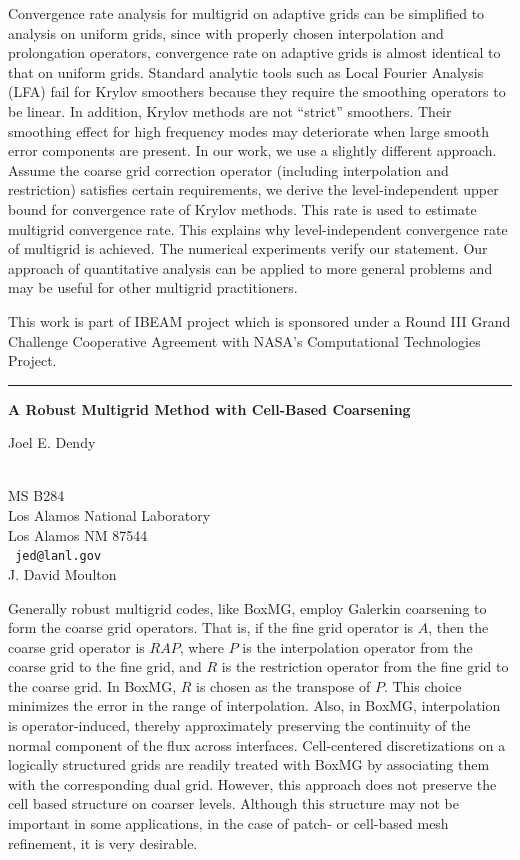 \documentclass[twosided]{report}
\begin{document}
Convergence rate analysis for multigrid on adaptive grids can be
simplified to analysis on uniform grids, since with properly chosen
interpolation and prolongation operators, convergence rate on adaptive
grids is almost identical to that on uniform grids. Standard analytic
tools such as Local Fourier Analysis (LFA) fail for Krylov smoothers
because they require the smoothing operators to be linear. In addition,
Krylov methods are not ``strict'' smoothers. Their smoothing effect for
high frequency modes may deteriorate when large smooth error components
are present. In our work, we use a slightly different approach. Assume
the coarse grid correction operator (including interpolation and
restriction) satisfies certain requirements, we derive the
level-independent upper bound for convergence rate of Krylov methods.
This rate is used to estimate multigrid convergence rate. This explains
why level-independent convergence rate of multigrid is achieved. The
numerical experiments verify our statement. Our approach of
quantitative analysis can be applied to more general problems and may
be useful for other multigrid practitioners.

This work is part of IBEAM project which is sponsored under a Round III
Grand Challenge Cooperative Agreement with NASA's Computational
Technologies Project.


\begin{center} \rule{6in}{1pt} \end{center}
\newpage	%


\begin{center}
{\large			\label{dendy}
{\bf
A Robust Multigrid Method with Cell-Based Coarsening
}

Joel E. Dendy} \\
MS B284
\\
Los Alamos National Laboratory
\\
Los Alamos NM 87544
\\ {\tt
jed@lanl.gov
}
\\
J. David Moulton
\end{center}

Generally robust multigrid codes, like BoxMG, employ Galerkin
coarsening to form the coarse grid operators. That is, if the fine
grid operator is $A$, then the coarse grid operator is $RAP$, where
$P$ is the interpolation operator from the coarse grid to the fine
grid, and $R$ is the restriction operator from the fine grid to the
coarse grid. In BoxMG, $R$ is chosen as the transpose of $P$. This choice
minimizes the error in the range of interpolation. Also, in BoxMG,
interpolation is operator-induced, thereby approximately preserving
the continuity of the normal component of the flux across interfaces.
Cell-centered discretizations on a logically structured grids are
readily treated with BoxMG by associating them with the corresponding
dual grid. However, this approach does not preserve the cell based
structure on coarser levels. Although this structure may not be
important in some applications, in the case of patch- or cell-based
mesh refinement, it is very desirable.
\end{document}
